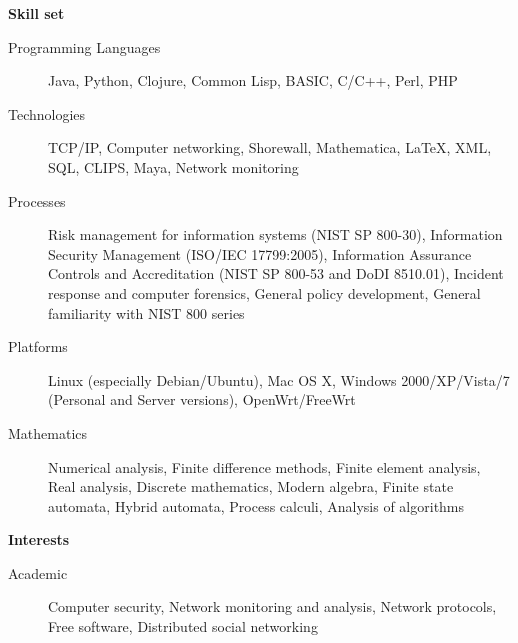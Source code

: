 \documentclass[letterpaper,11pt]{article}
\newcommand{\resheading}[1]{{\large \colorbox{mygrey}{\begin{minipage}{\textwidth}{\textbf{#1 \vphantom{p\^{E}}}}\end{minipage}}}}
\begin{document}

\resheading{Skill set}
\begin{description}
\item[Programming Languages]
Java, Python, Clojure, Common Lisp, BASIC, C/C++, Perl, PHP
\item[Technologies]
TCP/IP, Computer networking, Shorewall, Mathematica, \LaTeX, XML, SQL, CLIPS, Maya, Network monitoring
\item[Processes]
Risk management for information systems (NIST SP 800-30), Information Security Management (ISO/IEC 17799:2005), Information Assurance Controls and Accreditation (NIST SP 800-53 and DoDI 8510.01), Incident response and computer forensics, General policy development, General familiarity with NIST 800 series
\item[Platforms]
Linux (especially Debian/Ubuntu), Mac OS X, Windows 2000/XP/Vista/7 (Personal and Server versions), OpenWrt/FreeWrt
\item[Mathematics]
Numerical analysis, Finite difference methods, Finite element analysis, Real analysis, Discrete mathematics, Modern algebra, Finite state automata, Hybrid automata, Process calculi, Analysis of algorithms
\end{description}

\resheading{Interests}

\begin{description}
\item[Academic] Computer security, Network monitoring and analysis, Network protocols, Free software, Distributed social networking
\end{description}
\end{document}
